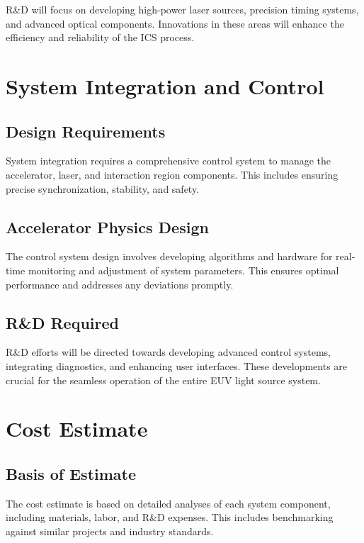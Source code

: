 \documentclass[10pt]{article}
\newcommand{\blankline}{\quad\pagebreak[3]}
\begin{document}
  R\&D will focus on developing high-power laser sources, precision timing systems, and advanced optical components. Innovations in these areas will enhance the efficiency and reliability of the ICS process.

\blankline
\blankline

\section{System Integration and Control}

  \subsection{Design Requirements}
  
  System integration requires a comprehensive control system to manage the accelerator, laser, and interaction region components. This includes ensuring precise synchronization, stability, and safety.
  
  \subsection{Accelerator Physics Design}
  
  The control system design involves developing algorithms and hardware for real-time monitoring and adjustment of system parameters. This ensures optimal performance and addresses any deviations promptly.
  
  \subsection{R\&D Required}  
  
  R\&D efforts will be directed towards developing advanced control systems, integrating diagnostics, and enhancing user interfaces. These developments are crucial for the seamless operation of the entire EUV light source system.


\blankline
\blankline

\section{Cost Estimate}

  \subsection{Basis of Estimate}
  
  The cost estimate is based on detailed analyses of each system component, including materials, labor, and R\&D expenses. This includes benchmarking against similar projects and industry standards.
  
\end{document}
